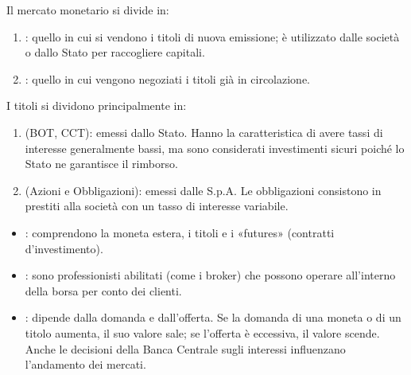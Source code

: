 \documentclass[letterpaper,10pt,italian]{sphinxmanual}
\begin{document}
\sphinxAtStartPar
Il mercato monetario si divide in:
\begin{enumerate}
%
\item {} 
\sphinxAtStartPar
{}: quello in cui si vendono i titoli di nuova emissione; è utilizzato dalle società o dallo Stato per raccogliere capitali.

\item {} 
\sphinxAtStartPar
{}: quello in cui vengono negoziati i titoli già in circolazione.

\end{enumerate}

\sphinxAtStartPar
{}

\sphinxAtStartPar
I titoli si dividono principalmente in:
\begin{enumerate}
%
\item {} 
\sphinxAtStartPar
{} (BOT, CCT): emessi dallo Stato. Hanno la caratteristica di avere tassi di interesse generalmente bassi, ma sono considerati investimenti sicuri poiché lo Stato ne garantisce il rimborso.

\item {} 
\sphinxAtStartPar
{} (Azioni e Obbligazioni): emessi dalle S.p.A. Le obbligazioni consistono in prestiti alla società con un tasso di interesse variabile.

\end{enumerate}

\sphinxAtStartPar
{}
\begin{itemize}
\item {} 
\sphinxAtStartPar
{}: comprendono la moneta estera, i titoli e i «futures» (contratti d’investimento).

\item {} 
\sphinxAtStartPar
{}: sono professionisti abilitati (come i broker) che possono operare all’interno della borsa per conto dei clienti.

\item {} 
\sphinxAtStartPar
{}: dipende dalla domanda e dall’offerta. Se la domanda di una moneta o di un titolo aumenta, il suo valore sale; se l’offerta è eccessiva, il valore scende. Anche le decisioni della Banca Centrale sugli interessi influenzano l’andamento dei mercati.

\end{itemize}
\end{document}
